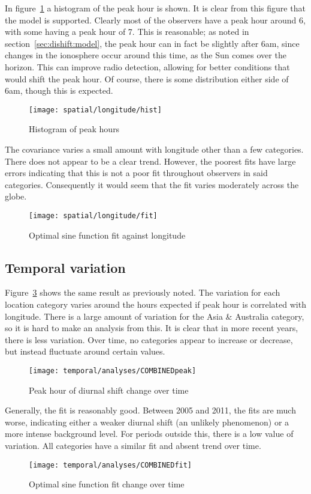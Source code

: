 In figure~\ref{fig:dishift:lon:hist} a histogram of the peak hour is shown. It is clear from this figure that the model is supported. Clearly most of the observers have a peak hour around 6, with some having a peak hour of 7. This is reasonable; as noted in section~\ref{sec:dishift:model}, the peak hour can in fact be slightly after 6am, since changes in the ionosphere occur around this time, as the Sun comes over the horizon. This can improve radio detection, allowing for better conditions that would shift the peak hour. Of course, there is some distribution either side of 6am, though this is expected.
\begin{figure}[h!]
	\centering
	\texttt{[image: spatial/longitude/hist]}
	\caption{Histogram of peak hours
		\label{fig:dishift:lon:hist}}
\end{figure}

The covariance varies a small amount with longitude other than a few categories. There does not appear to be a clear trend.  However, the poorest fits have large errors indicating that this is not a poor fit throughout observers in said categories. Consequently it would seem that the fit varies moderately across the globe. 
\begin{figure}[h!]
	\centering
	\texttt{[image: spatial/longitude/fit]}
	\caption{Optimal sine function fit against longitude
		\label{fig:dishift:lon:fit}}
\end{figure}


\subsection{Temporal variation}
Figure~\ref{fig:dishift:temp:peak} shows the same result as previously noted. The variation for each location category varies around the hours expected if peak hour is correlated with longitude. There is a large amount of variation for the Asia \& Australia category, so it is hard to make an analysis from this. It is clear that in more recent years, there is less variation. Over time, no categories appear to increase or decrease, but instead fluctuate around certain values.
\begin{figure}[h!]
	\centering
	\texttt{[image: temporal/analyses/COMBINEDpeak]}
	\caption{Peak hour of diurnal shift change over time
		\label{fig:dishift:temp:peak}}
\end{figure}
Generally, the fit is reasonably good. Between 2005 and 2011, the fits are much worse, indicating either a weaker diurnal shift (an unlikely phenomenon) or a more intense background level. For periods outside this, there is a low value of variation. All categories have a similar fit and absent trend over time.
\begin{figure}[h!]
	\centering
	\texttt{[image: temporal/analyses/COMBINEDfit]}
	\caption{Optimal sine function fit change over time
		\label{fig:dishift:temp:fit}}
\end{figure}

